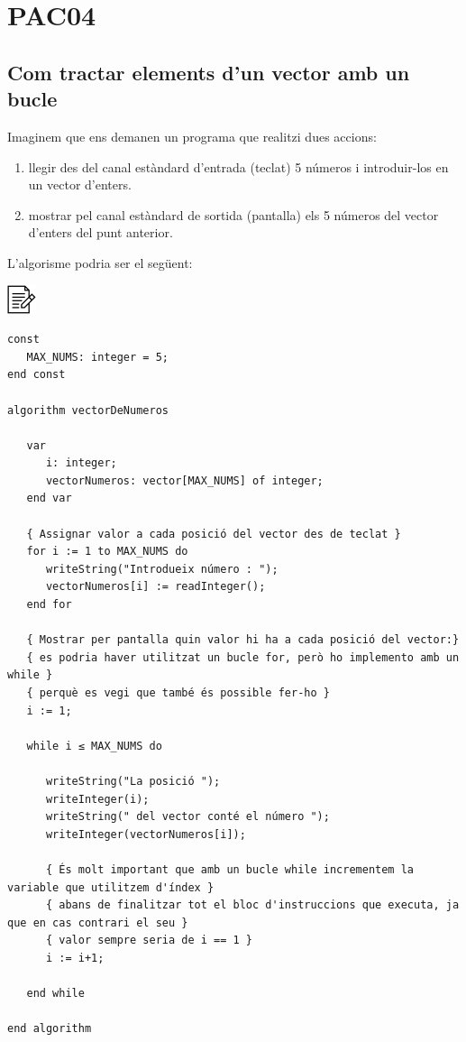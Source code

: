 \documentclass[]{book}
\providecommand{\tightlist}{%
  \setlength{\itemsep}{0pt}\setlength{\parskip}{0pt}}
\begin{document}
\hypertarget{pac04}{%
\chapter{PAC04}\label{pac04}}

\hypertarget{com-tractar-elements-dun-vector-amb-un-bucle}{%
\section{Com tractar elements d'un vector amb un bucle}\label{com-tractar-elements-dun-vector-amb-un-bucle}}

Imaginem que ens demanen un programa que realitzi dues accions:

\begin{enumerate}
\def\labelenumi{\arabic{enumi}.}
\tightlist
\item
  llegir des del canal estàndard d'entrada (teclat) 5 números i introduir-los en un vector d'enters.
\item
  mostrar pel canal estàndard de sortida (pantalla) els 5 números del vector d'enters del punt anterior.
\end{enumerate}

L'algorisme podria ser el següent:

\includegraphics{./img/alg.png}

\begin{verbatim}
const
   MAX_NUMS: integer = 5;
end const

algorithm vectorDeNumeros

   var
      i: integer;
      vectorNumeros: vector[MAX_NUMS] of integer;
   end var

   { Assignar valor a cada posició del vector des de teclat }
   for i := 1 to MAX_NUMS do
      writeString("Introdueix número : ");
      vectorNumeros[i] := readInteger();
   end for

   { Mostrar per pantalla quin valor hi ha a cada posició del vector:}
   { es podria haver utilitzat un bucle for, però ho implemento amb un while }
   { perquè es vegi que també és possible fer-ho }
   i := 1;

   while i ≤ MAX_NUMS do

      writeString("La posició ");
      writeInteger(i);
      writeString(" del vector conté el número ");
      writeInteger(vectorNumeros[i]);

      { És molt important que amb un bucle while incrementem la variable que utilitzem d'índex }
      { abans de finalitzar tot el bloc d'instruccions que executa, ja que en cas contrari el seu }
      { valor sempre seria de i == 1 }
      i := i+1;

   end while

end algorithm
\end{verbatim}
\end{document}
